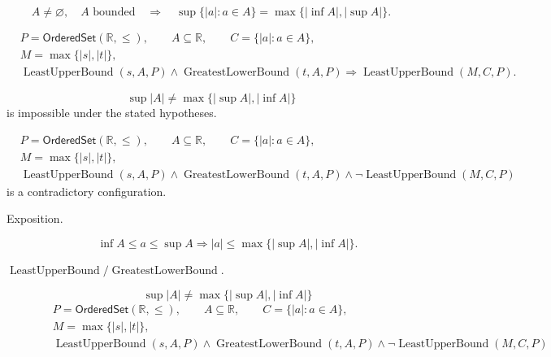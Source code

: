 \begin{remark*}
\[
A\neq\varnothing,\quad A\text{ bounded}
\quad\Longrightarrow\quad
\sup\{|a|:a\in A\}=\max\{|\inf A|,|\sup A|\}.
\]
\end{remark*}

\begin{remark*}
\[
\begin{aligned}
&P=\mathsf{OrderedSet}(\mathbb{R},\leq),\qquad A\subseteq\mathbb{R},\qquad C=\{|a|:a\in A\},\\
&M=\max\{|s|,|t|\},\\
&\operatorname{LeastUpperBound}(s,A,P)\land \operatorname{GreatestLowerBound}(t,A,P)
\Longrightarrow
\operatorname{LeastUpperBound}(M,C,P).
\end{aligned}
\]
\end{remark*}

\begin{remark*}
\[
\sup |A|\ne \max\{|\sup A|,|\inf A|\}
\]
is impossible under the stated hypotheses.
\end{remark*}

\begin{remark*}
\[
\begin{aligned}
&P=\mathsf{OrderedSet}(\mathbb{R},\leq),\qquad A\subseteq\mathbb{R},\qquad C=\{|a|:a\in A\},\\
&M=\max\{|s|,|t|\},\\
&\operatorname{LeastUpperBound}(s,A,P)\land \operatorname{GreatestLowerBound}(t,A,P)
\land
\neg\operatorname{LeastUpperBound}(M,C,P)
\end{aligned}
\]
is a contradictory configuration.
\end{remark*}

\begin{remark*}
\begin{description}
  \item[Exposition.]
\[
\inf A\le a\le \sup A
\Longrightarrow
|a|\le \max\{|\sup A|,|\inf A|\}.
\]


  \item[\(\operatorname{LeastUpperBound} / \operatorname{GreatestLowerBound}.\)]
  \[
\sup |A|\ne \max\{|\sup A|,|\inf A|\}
\]
\[
\begin{aligned}
&P=\mathsf{OrderedSet}(\mathbb{R},\leq),\qquad A\subseteq\mathbb{R},\qquad C=\{|a|:a\in A\},\\
&M=\max\{|s|,|t|\},\\
&\operatorname{LeastUpperBound}(s,A,P)\land \operatorname{GreatestLowerBound}(t,A,P)
\land
\neg\operatorname{LeastUpperBound}(M,C,P)
\end{aligned}
\]
\end{description}
\end{remark*}

